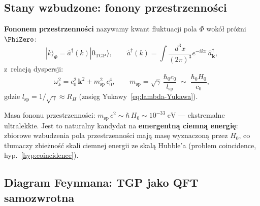 \subsection{Stany wzbudzone: fonony przestrzenności}%
\label{app:E-phonons}

\begin{definition}\label{def:phonon}
\textbf{Fononem przestrzenności} nazywamy kwant fluktuacji
pola $\Phi$ wokół próżni $\PhiZero$:
\begin{equation}\label{eq:phonon-state}
    |k\rangle_\Phi = \hat{a}^\dagger(k)|0_{\mathrm{TGP}}\rangle,
    \qquad
    \hat{a}^\dagger(k) = \int \frac{d^3x}{(2\pi)^3}
    e^{-ikx}\,\hat{a}^\dagger_{\mathbf{k}},
\end{equation}
z~relacją dyspersji:
\begin{equation}\label{eq:phonon-dispersion}
    \omega_k^2 = c_0^2\,\mathbf{k}^2 + m_{\mathrm{sp}}^2\,c_0^4,
    \qquad
    m_{\mathrm{sp}} = \sqrt{\gamma}\,\frac{\hbar_0 c_0}{l_{\mathrm{sp}}}
    \;\sim\; \frac{\hbar_0 H_0}{c_0},
\end{equation}
gdzie $l_{\mathrm{sp}} = 1/\sqrt{\gamma} \approx R_H$
(zasięg Yukawy~\ref{eq:lambda-Yukawa}).
\end{definition}

\begin{remark}
Masa fononu przestrzenności:
$m_{\mathrm{sp}}\,c^2 \sim \hbar\,H_0 \sim 10^{-33}\;\mathrm{eV}$
--- ekstremalne ultralekkie. Jest to naturalny kandydat na
\textbf{emergentną ciemną energię}: zbiorowe wzbudzenia
pola przestrzenności mają masę wyznaczoną przez $H_0$,
co tłumaczy zbieżność skali ciemnej energii ze skalą Hubble'a
(problem coincidence, hyp.~\ref{hyp:coincidence}).
\end{remark}

\subsection{Diagram Feynmana: TGP jako QFT samozwrotna}%
\label{app:E-feynman}


